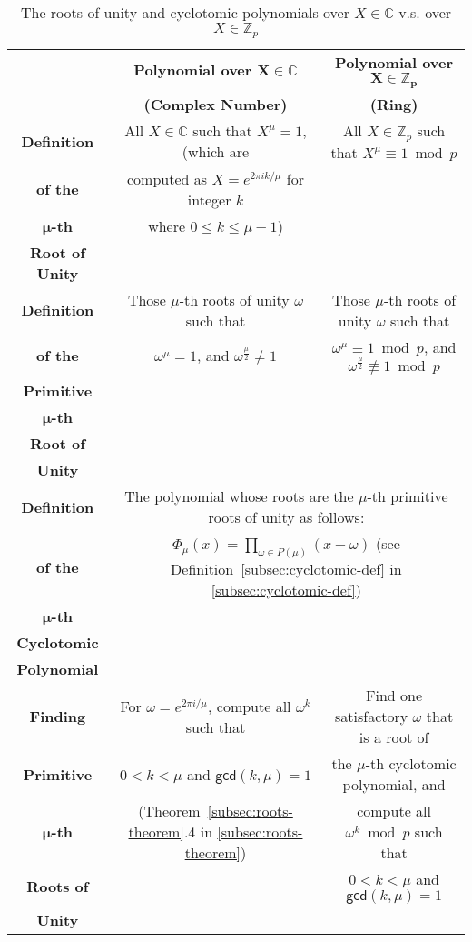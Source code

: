 \begin{table}[h] %
\begin{tabular}{|c||c||c|}
\hline \hline
& \textbf{Polynomial over $\bm{X} \bm{\in} \bm{\mathbb{C}}$} & \textbf{Polynomial over $\bm{X} \in \bm{\mathbb{Z}}_{\bm{p}}$} \\ 
& \textbf{(Complex Number)} & \textbf{(Ring)} \\ \hline \hline
\textbf{Definition}&All $X \in \mathbb{C}$ such that $X^\mu = 1$, (which are&All $X \in \mathbb{Z}_p$ such that $X^\mu \equiv 1 \bmod p$\\
\textbf{of the}&computed as $X = e^{2 \pi i k / \mu}$ for integer $k$&\\
\textbf{$\bm \mu$-th}&where $0 \leq k \leq \mu - 1$)&\\
\textbf{Root of Unity}&&\\\hline
\textbf{Definition}&Those $\mu$-th roots of unity $\omega$ such that&Those $\mu$-th roots of unity $\omega$ such that\\
\textbf{of the}&$\omega^{\mu} = 1$, and $\omega^{\frac{\mu}{2}} \neq 1$&$\omega^{\mu} \equiv 1 \bmod p$, and $\omega^{\frac{\mu}{2}} \not\equiv 1 \bmod p$\\
\textbf{Primitive}&&\\
\textbf{$\bm \mu$-th}&&\\
\textbf{Root of}&&\\
\textbf{Unity}&&\\\hline
\textbf{Definition}&\multicolumn{2}{|c|}{The polynomial whose roots are the $\mu$-th primitive roots of unity as follows:}\\
\textbf{of the}&\multicolumn{2}{|c|}{$ \Phi_{\mu}(x) = \prod_{\omega \in P(\mu)} (x - \omega) $  \text{ } (see Definition~\ref*{subsec:cyclotomic-def} in \autoref{subsec:cyclotomic-def})}\\
\textbf{$\bm \mu$-th}&\multicolumn{2}{|c|}{}\\
\textbf{Cyclotomic}&\multicolumn{2}{|c|}{}\\
\textbf{Polynomial}&\multicolumn{2}{|c|}{}\\\hline
\textbf{Finding}&For $\omega = e^{2 \pi i/ \mu}$, compute all ${\omega}^k$ such that&Find one satisfactory $\omega$ that is a root of\\
\textbf{Primitive}&$0 < k < \mu $ and $\textsf{gcd}(k, \mu) = 1$&the $\mu$-th cyclotomic polynomial, and\\
\textbf{$\bm \mu$-th}&(Theorem~\ref*{subsec:roots-theorem}.4 in \autoref{subsec:roots-theorem})&compute all $\omega^k \bmod p$ such that\\
\textbf{Roots of}&&$0 < k < \mu $ and $\textsf{gcd}(k, \mu) = 1$\\
\textbf{Unity}&&\\\hline\hline
\end{tabular}
\caption{The roots of unity and cyclotomic polynomials over $X \in \mathbb{C}$ v.s. over $X \in \mathbb{Z}_p$}
\label{tab:cyclotomic-polynomial-comparison}
\end{table}

